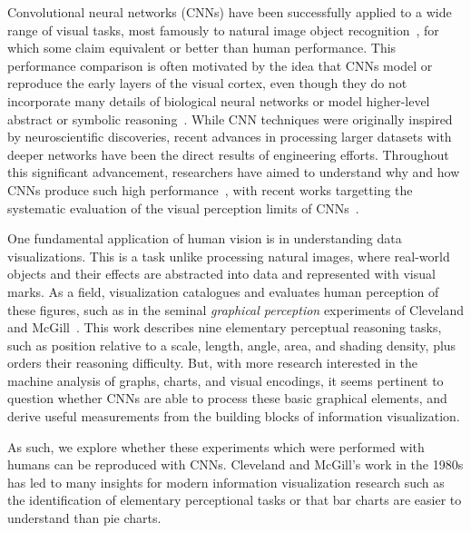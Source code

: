 
\maketitle

Convolutional neural networks (CNNs) have been successfully applied to a wide range of visual tasks, most famously to natural image object recognition~\cite{krizhevsky_imagenet2012, simonyan_very_deep2014, szegedy2015}, for which some claim equivalent or better than human performance. This performance comparison is often motivated by the idea that CNNs model or reproduce the early layers of the visual cortex, even though they do not incorporate many details of biological neural networks or model higher-level abstract or symbolic reasoning~\cite{yamins2016using, hassabis2017neuroscience, human_vs_machine_vision}. While CNN techniques were originally inspired by neuroscientific discoveries, recent advances in processing larger datasets with deeper networks have been the direct results of engineering efforts. Throughout this significant advancement, researchers have aimed to understand why and how CNNs produce such high performance~\cite{goodfellow_book, deeplearning_blackbox2017}, with recent works targetting the systematic evaluation of the visual perception limits of CNNs~\cite{clevr, not_so_clevr}.

One fundamental application of human vision is in understanding data visualizations. This is a task unlike processing natural images, where real-world objects and their effects are abstracted into data and represented with visual marks. As a field, visualization catalogues and evaluates human perception of these figures, such as in the seminal \emph{graphical perception} experiments of Cleveland and McGill~\cite{cleveland_mcgill}. This work describes nine elementary perceptual reasoning tasks, such as position relative to a scale, length, angle, area, and shading density, plus orders their reasoning difficulty. But, with more research interested in the machine analysis of graphs, charts, and visual encodings, it seems pertinent to question whether CNNs are able to process these basic graphical elements, and derive useful measurements from the building blocks of information visualization.

As such, we explore whether these experiments which were performed with humans can be reproduced with CNNs. Cleveland and McGill's work in the 1980s has led to many insights for modern information visualization research such as the identification of elementary perceptional tasks or that bar charts are easier to understand than pie charts. 

